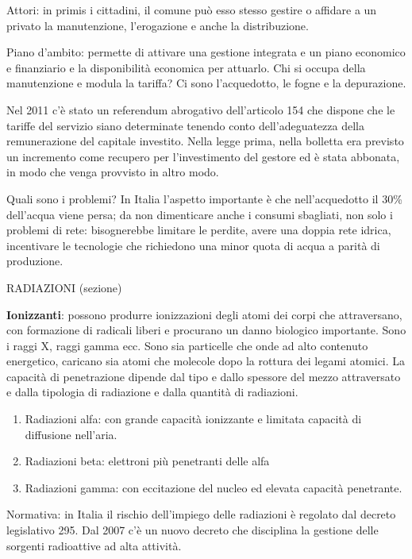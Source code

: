 \documentclass[]{article}
\begin{document}
Attori: in primis i cittadini, il comune può esso stesso gestire o
affidare a un privato la manutenzione, l'erogazione e anche la
distribuzione.

Piano d'ambito: permette di attivare una gestione integrata e un piano
economico e finanziario e la disponibilità economica per attuarlo. Chi
si occupa della manutenzione e modula la tariffa? Ci sono l'acquedotto,
le fogne e la depurazione.

Nel 2011 c'è stato un referendum abrogativo dell'articolo 154 che
dispone che le tariffe del servizio siano determinate tenendo conto
dell'adeguatezza della remunerazione del capitale investito. Nella legge
prima, nella bolletta era previsto un incremento come recupero per
l'investimento del gestore ed è stata abbonata, in modo che venga
provvisto in altro modo.

Quali sono i problemi? In Italia l'aspetto importante è che
nell'acquedotto il 30\% dell'acqua viene persa; da non dimenticare anche
i consumi sbagliati, non solo i problemi di rete: bisognerebbe limitare
le perdite, avere una doppia rete idrica, incentivare le tecnologie che
richiedono una minor quota di acqua a parità di produzione.

RADIAZIONI (sezione)

\textbf{Ionizzanti}: possono produrre ionizzazioni degli atomi dei corpi
che attraversano, con formazione di radicali liberi e procurano un danno
biologico importante. Sono i raggi X, raggi gamma ecc. Sono sia
particelle che onde ad alto contenuto energetico, caricano sia atomi che
molecole dopo la rottura dei legami atomici. La capacità di penetrazione
dipende dal tipo e dallo spessore del mezzo attraversato e dalla
tipologia di radiazione e dalla quantità di radiazioni.

\begin{enumerate}
\def\labelenumi{\arabic{enumi}.}
\item
  Radiazioni alfa: con grande capacità ionizzante e limitata capacità di
  diffusione nell'aria.
\item
  Radiazioni beta: elettroni più penetranti delle alfa
\item
  Radiazioni gamma: con eccitazione del nucleo ed elevata capacità
  penetrante.
\end{enumerate}

Normativa: in Italia il rischio dell'impiego delle radiazioni è regolato
dal decreto legislativo 295. Dal 2007 c'è un nuovo decreto che
disciplina la gestione delle sorgenti radioattive ad alta attività.
\end{document}
